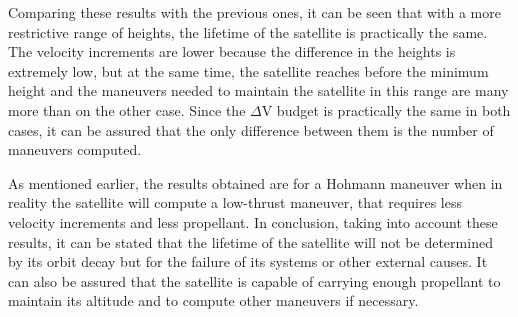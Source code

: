 Comparing these results with the previous ones, it can be seen that with a more restrictive range of heights, the lifetime of the satellite is practically the same. The velocity increments are lower because the difference in the heights is extremely low, but at the same time, the satellite reaches before the minimum height and the maneuvers needed to maintain the satellite in this range are many more than on the other case. Since the $\Delta$V budget is practically the same in both cases, it can be assured that the only difference between them is the number of maneuvers computed.

As mentioned earlier, the results obtained are for a Hohmann maneuver when in reality the satellite will compute a low-thrust maneuver, that requires less velocity increments and less propellant. In conclusion, taking into account these results, it can be stated that the lifetime of the satellite will not be determined by its orbit decay but for the failure of its systems or other external causes. It can also be assured that the satellite is capable of carrying enough propellant to maintain its altitude and to compute other maneuvers if necessary.